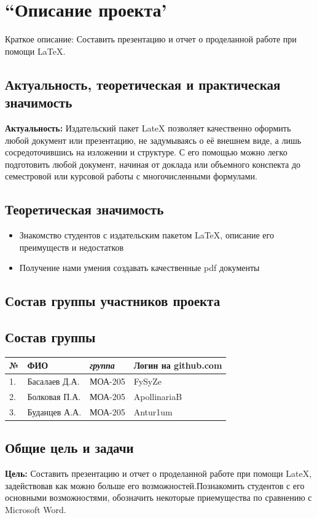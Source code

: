 \documentclass[14pt, a4paper]{extarticle}
\begin{document}
\newpage%
\tableofcontents


\newpage%
\section{``Описание проекта'}
Краткое описание: Составить презентацию и отчет о проделанной работе при помощи \LaTeX. 
\subsection{Актуальность, теоретическая и практическая значимость}
\textbf{Актуальность:}
Издательский пакет LateX позволяет качественно оформить любой документ или презентацию, не задумываясь о её внешнем виде, а лишь сосредоточившись на изложении и структуре. С его помощью можно легко подготовить любой документ, начиная от доклада или объемного конспекта до семестровой или курсовой работы с многочисленными формулами.
\subsection{Теоретическая значимость}
\begin{itemize}
  \item Знакомство студентов с издательским пакетом \LaTeX, описание его преимуществ и недостатков
 \item Получение нами умения создавать качественные pdf документы
\end{itemize} 
\subsection{Состав группы участников проекта}
\subsection*{Состав группы}
\begin{tabular}{| l| l| l| l|}
\hline {\bfseries \large №} & {\bfseries \large ФИО} & {\bfseries \large \textsl{группа}} & {\bfseries \large Логин на github.com } \\ \hline
1. & Басалаев Д.А.  & МОА-205 & FySyZe \\ \hline
2. & Болковая П.А.  & МОА-205 & ApollinariaB \\ \hline
3. & Буданцев А.А.  & МОА-205 & Antur1um \\ \hline
\end{tabular}
\subsection{Общие цель и задачи}
\textbf{Цель:} Составить презентацию и отчет о проделанной работе при помощи LateX, задействовав как можно больше его возможностей.Познакомить студентов с его основными возможностями, обозначить некоторые приемущества по сравнению с Microsoft Word.
\end{document}
